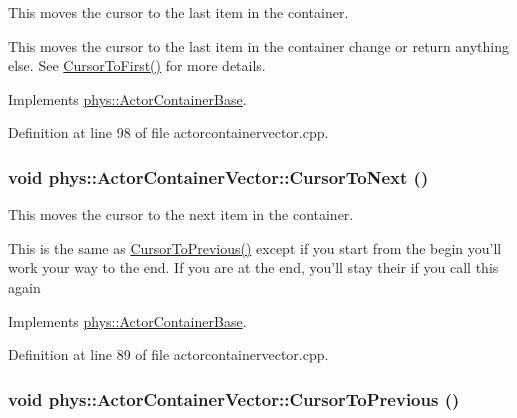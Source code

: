 This moves the cursor to the last item in the container. 

This moves the cursor to the last item in the container change or return anything else. See \hyperlink{classphys_1_1ActorContainerVector_ad9c2eb2a9405dcf687c86745afc9c031}{CursorToFirst()} for more details. 

Implements \hyperlink{classphys_1_1ActorContainerBase_afad072e018a04c190e5e5fb93b82b354}{phys::ActorContainerBase}.



Definition at line 98 of file actorcontainervector.cpp.

\hypertarget{classphys_1_1ActorContainerVector_a1c72366a6261d8e98dc0a9d2fad9f70f}{
\subsubsection[{CursorToNext}]{\setlength{\rightskip}{0pt plus 5cm}void phys::ActorContainerVector::CursorToNext ()}}
\label{d3/d64/classphys_1_1ActorContainerVector_a1c72366a6261d8e98dc0a9d2fad9f70f}


This moves the cursor to the next item in the container. 

This is the same as \hyperlink{classphys_1_1ActorContainerVector_ac483bcdf348f55dc8b04a8805a002413}{CursorToPrevious()} except if you start from the begin you'll work your way to the end. If you are at the end, you'll stay their if you call this again 

Implements \hyperlink{classphys_1_1ActorContainerBase_a1aa337456a4e74cb5740dbae08778072}{phys::ActorContainerBase}.



Definition at line 89 of file actorcontainervector.cpp.

\hypertarget{classphys_1_1ActorContainerVector_ac483bcdf348f55dc8b04a8805a002413}{
\subsubsection[{CursorToPrevious}]{\setlength{\rightskip}{0pt plus 5cm}void phys::ActorContainerVector::CursorToPrevious ()}}
\label{d3/d64/classphys_1_1ActorContainerVector_ac483bcdf348f55dc8b04a8805a002413}



